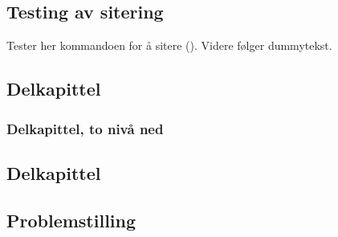 
\subsection{Testing av sitering}
Tester her kommandoen for å sitere (\cite{latex}). Videre følger dummytekst.

\subsection{Delkapittel}
\kant[7]
\subsubsection{Delkapittel, to nivå ned}
\kant[8]

\subsection{Delkapittel}
\kant[9-10]

\subsection{Problemstilling}
\kant[11-15]
